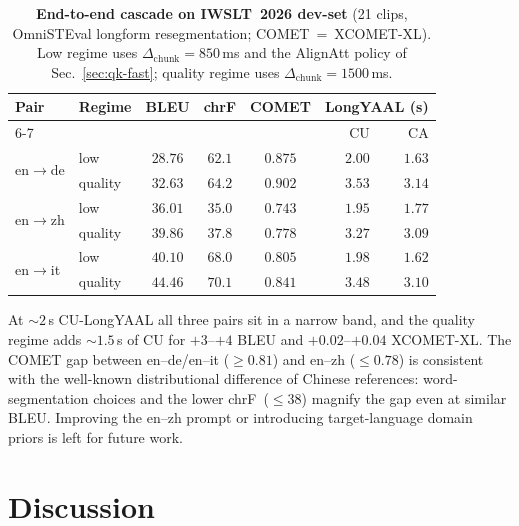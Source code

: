\documentclass[11pt,twocolumn]{article}
\begin{document}
\begin{table}[t]
\centering
\small
\setlength{\tabcolsep}{3.5pt}
\begin{tabular}{l l c c c r r}
\toprule
Pair & Regime & BLEU & chrF & COMET & \multicolumn{2}{c}{LongYAAL (s)} \\
\cmidrule(lr){6-7}
& & & & & CU & CA \\
\midrule
\multirow{2}{*}{en$\to$de} & low     & $28.76$ & $62.1$ & $0.875$ & $2.00$ & $1.63$ \\
                           & quality & $32.63$ & $64.2$ & $0.902$ & $3.53$ & $3.14$ \\
\midrule
\multirow{2}{*}{en$\to$zh} & low     & $36.01$ & $35.0$ & $0.743$ & $1.95$ & $1.77$ \\
                           & quality & $39.86$ & $37.8$ & $0.778$ & $3.27$ & $3.09$ \\
\midrule
\multirow{2}{*}{en$\to$it} & low     & $40.10$ & $68.0$ & $0.805$ & $1.98$ & $1.62$ \\
                           & quality & $44.46$ & $70.1$ & $0.841$ & $3.48$ & $3.10$ \\
\bottomrule
\end{tabular}
\caption{\textbf{End-to-end cascade on IWSLT~2026 dev-set}
(21 clips, OmniSTEval longform resegmentation; COMET~=~XCOMET-XL).
Low regime uses $\Delta_{\mathrm{chunk}}{=}850$\,ms and the AlignAtt
policy of Sec.~\ref{sec:qk-fast}; quality regime uses
$\Delta_{\mathrm{chunk}}{=}1500$\,ms.}
\label{tab:e2e}
\end{table}

At ${\sim}2$\,s CU-LongYAAL all three pairs sit in a narrow band,
and the quality regime adds ${\sim}1.5$\,s of CU for ${+}3$--${+}4$
BLEU and ${+}0.02$--${+}0.04$ XCOMET-XL. The COMET gap between
en--de/en--it ($\geq 0.81$) and en--zh ($\leq 0.78$) is consistent
with the well-known distributional difference of Chinese references:
word-segmentation choices and the lower chrF~(${\leq}38$) magnify the
gap even at similar BLEU. Improving the en--zh prompt or introducing
target-language domain priors is left for future work.

\section{Discussion}
\label{sec:discussion}
\end{document}
